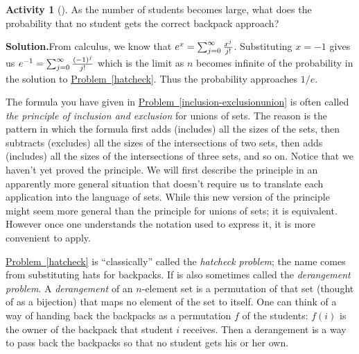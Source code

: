 \documentclass[10pt,]{book}
\theoremstyle{plain}
\theoremstyle{definition}
\newtheorem{activity}[project]{Activity}
\numberwithin{equation}{chapter}
\begin{document}
\begin{activity}[]\label{activity-105}
As the number of students becomes large, what does the probability that no student gets the correct backpack approach?%
\par\medskip\noindent%
\textbf{Solution.}\quad From calculus, we know that \(e^x=\sum_{j=0}^\infty {x^j\over
j!}\). Substituting \(x=-1\) gives us \(e^{-1}=\sum_{j=0}^\infty
{(-1)^j\over j!}\) which is the limit as \(n\) becomes infinite of the probability in the solution to \hyperref[hatcheck]{Problem~\ref{hatcheck}}. Thus the probability approaches \(1/e\).%
\end{activity}
The formula you have given in \hyperref[inclusion-exclusionunion]{Problem~\ref{inclusion-exclusionunion}} is often called \emph{the principle of inclusion and exclusion} for unions of sets. The reason is the pattern in which the formula first adds (includes) all the sizes of the sets, then subtracts (excludes) all the sizes of the intersections of two sets, then adds (includes) all the sizes of the intersections of three sets, and so on. Notice that we haven't yet proved the principle. We will first describe the principle in an apparently more general situation that doesn't require us to translate each application into the language of sets. While this new version of the principle might seem more general than the principle for unions of sets; it is equivalent. However once one understands the notation used to express it, it is more convenient to apply.%
\par
\hyperref[hatcheck]{Problem~\ref{hatcheck}} is ``classically'' called the \emph{hatcheck problem}; the name comes from substituting hats for backpacks. If is also sometimes called the \emph{derangement problem}. A \emph{derangement} of an \(n\)-element set is a permutation of that set (thought of as a bijection) that maps no element of the set to itself. One can think of a way of handing back the backpacks as a permutation \(f\) of the students: \(f(i)\) is the owner of the backpack that student \(i\) receives. Then a derangement is a way to pass back the backpacks so that no student gets his or her own.%
\typeout{************************************************}
\typeout{************************************************}
\end{document}
